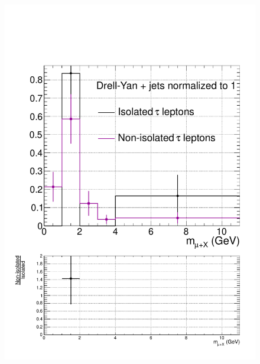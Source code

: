 \begin{figure}[hbtp]
  \begin{center}
    \includegraphics[width=0.8\cmsFigWidth]{figures/isoVsNonIsoTaus_DY_lowMT_v87}

\end{center}
\end{figure}
